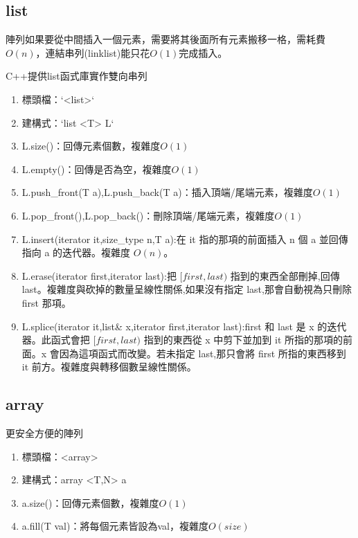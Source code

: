 \subsection{list}
陣列如果要從中間插入一個元素，需要將其後面所有元素搬移一格，需耗費$O(n)$，連結串列(linklist)能只花$O(1)$完成插入。


C++提供list函式庫實作雙向串列
\begin{enumerate}
\item 標頭檔：`<list>`
\item 建構式：`list <T> L`
\item L.size()：回傳元素個數，複雜度$O(1)$
\item L.empty()：回傳是否為空，複雜度$O(1)$
\item L.push\_front(T a),L.push\_back(T a)：插入頂端/尾端元素，複雜度$O(1)$
\item L.pop\_front(),L.pop\_back()：刪除頂端/尾端元素，複雜度$O(1)$
\item L.insert(iterator it,size\_type n,T a):在 it 指的那項的前面插入 n 個 a 並回傳指向 a 的迭代器。複雜度 $O(n)$。
\item L.erase(iterator first,iterator last):把 $[first,last)$ 指到的東西全部刪掉,回傳 last。複雜度與砍掉的數量呈線性關係,如果沒有指定 last,那會自動視為只刪除 first 那項。
\item L.splice(iterator it,list\& x,iterator first,iterator last):first 和 last 是 x 的迭代器。此函式會把 $[first,last)$ 指到的東西從 x 中剪下並加到 it 所指的那項的前面。x 會因為這項函式而改變。若未指定 last,那只會將 first 所指的東西移到 it 前方。複雜度與轉移個數呈線性關係。
\end{enumerate}

\subsection{array}
更安全方便的陣列
\begin{enumerate}
\item 標頭檔：<array>
\item 建構式：array <T,N> a
\item a.size()：回傳元素個數，複雜度$O(1)$
\item a.fill(T val)：將每個元素皆設為val，複雜度$O(size)$
\end{enumerate}

